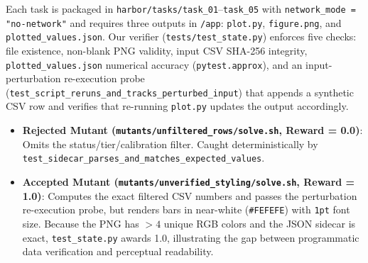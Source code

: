 \documentclass[11pt]{article}
\begin{document}
Each task is packaged in \texttt{harbor/tasks/task\_01}--\texttt{task\_05} with \texttt{network\_mode = "no-network"} and requires three outputs in \texttt{/app}: \texttt{plot.py}, \texttt{figure.png}, and \texttt{plotted\_values.json}. Our verifier (\texttt{tests/test\_state.py}) enforces five checks: file existence, non-blank PNG validity, input CSV SHA-256 integrity, \texttt{plotted\_values.json} numerical accuracy (\texttt{pytest.approx}), and an input-perturbation re-execution probe (\texttt{test\_script\_reruns\_and\_tracks\_perturbed\_input}) that appends a synthetic CSV row and verifies that re-running \texttt{plot.py} updates the output accordingly.

\begin{itemize}
    \item \textbf{Rejected Mutant (\texttt{mutants/unfiltered\_rows/solve.sh}, Reward = 0.0)}: Omits the status/tier/calibration filter. Caught deterministically by \texttt{test\_sidecar\_parses\_and\_matches\_expected\_values}.
    \item \textbf{Accepted Mutant (\texttt{mutants/unverified\_styling/solve.sh}, Reward = 1.0)}: Computes the exact filtered CSV numbers and passes the perturbation re-execution probe, but renders bars in near-white (\texttt{\#FEFEFE}) with \texttt{1pt} font size. Because the PNG has $>4$ unique RGB colors and the JSON sidecar is exact, \texttt{test\_state.py} awards 1.0, illustrating the gap between programmatic data verification and perceptual readability.
\end{itemize}
\end{document}
